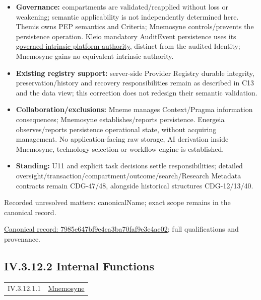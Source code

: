 \begin{itemize}
\item \textbf{Governance:} compartments are validated/reapplied without loss or weakening;
  semantic applicability is not independently determined here. Themis owns PEP
  semantics and Criteria; Mnemosyne controls/prevents the persistence operation.
  Kleio mandatory AuditEvent persistence uses its
  \href{\detokenize{../../../../../../../../docs/markdown/05-information-systems-architecture/component-register.md#kleio-capture-authority}}{governed intrinsic platform authority}, distinct
  from the audited Identity; Mnemosyne gains no equivalent intrinsic authority.

\item \textbf{Existing registry support:} server-side Provider Registry durable integrity,
  preservation/history and recovery responsibilities remain as described in C13
  and the data view; this correction does not redesign their semantic validation.

\item \textbf{Collaboration/exclusions:} Mneme manages Context/Pragma information consequences;
  Mnemosyne establishes/reports persistence. Energeia observes/reports persistence
  operational state, without acquiring management. No application-facing raw storage,
  AI derivation inside Mnemosyne, technology selection or workflow engine is established.

\item \textbf{Standing:} U11 and explicit task decisions settle responsibilities; detailed
  oversight/transaction/compartment/outcome/search/Research Metadata contracts remain
  CDG-47/48, alongside historical structures CDG-12/13/40.

\end{itemize}

{\small Recorded unresolved matters: canonicalName; exact scope remains in the canonical record.}\par
{\footnotesize \href{../../../../../../../continuum/application/application-component/7985e647bf9e4ca3ba70faf9e3e4ae02.md}{Canonical record: 7985e647bf9e4ca3ba70faf9e3e4ae02}; full qualifications and provenance.}\par
\subsection*{IV.3.12.2 Internal Functions}
\label{navigation:IV.3.12.2}

\begin{longtable}{p{.22\linewidth}p{.73\linewidth}}
IV.3.12.1.1 & \hyperref[element:7985e647bf9e4ca3ba70faf9e3e4ae02]{Mnemosyne} \\
\end{longtable}
